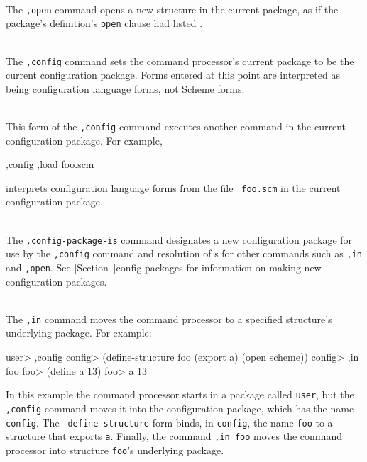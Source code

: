 \begin{description}
\item {} \\
    The {\tt,open} command opens a new structure in the current
    package, as if the package's definition's {\tt open} clause
    had listed .

\item {} \\
    The {\tt,config} command sets the command processor's current
    package to be the current configuration package.  Forms entered at
    this point are interpreted as being configuration language forms,
    not Scheme forms.

\item {} \\
    This form of the {\tt,config} command executes another command in
    the current configuration package.  For example,
\begin{example}
,config ,load foo.scm
\end{example}
    interprets configuration language forms from the file {\tt
    foo.scm} in the current configuration package.

\item {} \\
    The {\tt,config-package-is} command designates a new configuration
    package for use by the {\tt,config} command and resolution of
    s for other commands such as {\tt,in} and
    {\tt,open}.  See
    [Section~\Ref]{config-packages}
    for information on making new configuration packages.

\item {} \\
    The {\tt ,in} command moves the command processor to a specified
    structure's underlying package.  For example:
\begin{example}
user> ,config
config> (define-structure foo (export a)
          (open scheme))
config> ,in foo
foo> (define a 13)
foo> a
13
\end{example}
    In this example the command processor starts in a package called
    {\tt user}, but the {\tt ,config} command moves it into the
    configuration package, which has the name {\tt config}.  The {\tt
    define-structure} form binds, in {\tt config}, the name {\tt foo} to
    a structure that exports {\tt a}.  Finally, the command {\tt ,in
    foo} moves the command processor into structure {\tt foo}'s
    underlying package.


\end{description}
